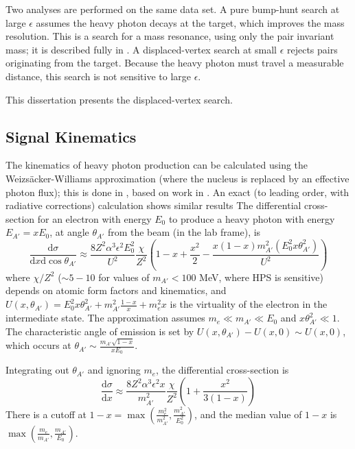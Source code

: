 Two analyses are performed on the same data set.
A pure bump-hunt search at large $\epsilon$ assumes the heavy photon decays at the target, which improves the mass resolution.
This is a search for a mass resonance, using only the pair invariant mass; it is described fully in \cite{moreno_search_2016}.
A displaced-vertex search at small $\epsilon$ rejects pairs originating from the target.
Because the heavy photon must travel a measurable distance, this search is not sensitive to large $\epsilon$.

This dissertation presents the displaced-vertex search.

\subsection{Signal Kinematics}
\label{sec:signal_kinematics}
The kinematics of heavy photon production can be calculated using the Weizs{\"a}cker-Williams approximation (where the nucleus is replaced by an effective photon flux); this is done in \cite{bjorken_new_2009}, based on work in \cite{tsai_pair_1974,tsai_axion_1986}.
An exact (to leading order, with radiative corrections) calculation shows similar results \cite{beranek_theoretical_2013,beranek_study_2014}
The differential cross-section for an electron with energy $E_0$ to produce a heavy photon with energy $E_{A'}=xE_0$, at angle $\theta_{A'}$ from the beam (in the lab frame), is
\begin{equation}
    \frac{\mathrm{d}\sigma}{\mathrm{d}x \mathrm{d}\cos \theta_{A'}} \approx \frac{8 Z^2 \alpha^3\epsilon^2E_0^2}{U^2} \frac{\chi}{Z^2} \left( 1-x+\frac{x^2}{2} - \frac{x(1-x)m^2_{A'} (E_0^2 x \theta_{A'}^2)}{U^2} \right)
    \label{eq:cx_xtheta}
\end{equation}
where $\chi/Z^2$ ($\sim 5-10$ for values of $m_{A'}<100$ MeV, where HPS is sensitive) depends on atomic form factors and kinematics, and $U(x,\theta_{A'}) = E_0^2x\theta_{A'}^2 + m_{A'}^2\frac{1-x}{x} + m_e^2 x$ is the virtuality of the electron in the intermediate state.
The approximation assumes $m_e \ll m_{A'} \ll E_0$ and $x\theta_{A'}^2 \ll 1$.
The characteristic angle of emission is set by $U(x,\theta_{A'})-U(x,0)\sim U(x,0)$, which occurs at $\theta_{A'}\sim \frac{m_{A'}\sqrt{1-x}}{xE_0}$.

Integrating out $\theta_{A'}$ and ignoring $m_e$, the differential cross-section is
\begin{equation}
    \frac{\mathrm{d}\sigma}{\mathrm{d}x} \approx \frac{8 Z^2 \alpha^3\epsilon^2 x}{m_{A'}^2} \frac{\chi}{Z^2} \left( 1 + \frac{x^2}{3(1-x)} \right)
    \label{eq:cx_x}
\end{equation}
There is a cutoff at $1-x = \max \left(\frac{m_e^2}{m_{A'}^2},\frac{m_{A'}^2}{E_0^2} \right)$, and the median value of $1-x$ is $\max \left(\frac{m_e}{m_{A'}},\frac{m_{A'}}{E_0} \right)$.

